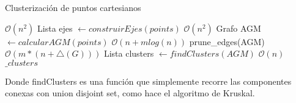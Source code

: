 \begin{algorithm}[H]
\caption{Clusterización de puntos cartesianos}
\begin{algorithmic}[1]
 \Comment $\mathcal{O}(n^2)$
	\State Lista ejes $\gets construirEjes(points)$ \Comment $\mathcal{O}(n^2)$
	\State Grafo AGM $\gets calcularAGM(points)$ \Comment $\mathcal{O}(n + mlog(n))$
	\State prune_edges(AGM) \Comment $\mathcal{O}(m*(n + \triangle(G)))$
	\State Lista clusters $\gets findClusters(AGM)$ \Comment $\mathcal{O}(n)$
	\State \Return $\_clusters$
\EndFunction
\end{algorithmic}
\end{algorithm}

Donde findClusters es una función que simplemente recorre las componentes conexas con union disjoint set, como hace el algoritmo de Kruskal. 

\vskip 8pt